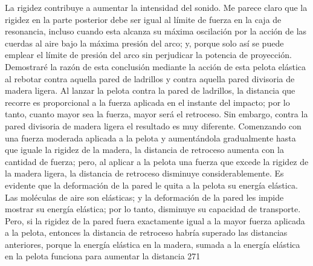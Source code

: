 La rigidez contribuye a aumentar la intensidad del sonido. Me parece claro que la rigidez en la parte posterior debe ser igual al límite de fuerza en la caja de resonancia, incluso cuando esta alcanza su máxima oscilación por la acción de las cuerdas al aire bajo la máxima presión del arco; y, porque solo así se puede emplear el límite de presión del arco sin perjudicar la potencia de proyección.
Demostraré la razón de esta conclusión mediante la acción de esta pelota elástica al rebotar contra aquella pared de ladrillos y contra aquella pared divisoria de madera ligera. Al lanzar la pelota contra la pared de ladrillos, la distancia que recorre es proporcional a la fuerza aplicada en el instante del impacto; por lo tanto, cuanto mayor sea la fuerza, mayor será el retroceso. Sin embargo, contra la pared divisoria de madera ligera el resultado es muy diferente. Comenzando con una fuerza moderada aplicada a la pelota y aumentándola gradualmente hasta que iguale la rigidez de la madera, la distancia de retroceso aumenta con la cantidad de fuerza; pero, al aplicar a la pelota una fuerza que excede la rigidez de la madera ligera, la distancia de retroceso disminuye considerablemente. Es evidente que la deformación de la pared le quita a la pelota su energía elástica. Las moléculas de aire son elásticas; y la deformación de la pared les impide mostrar su energía elástica; por lo tanto, disminuye su capacidad de transporte. Pero, si la rigidez de la pared fuera exactamente igual a la mayor fuerza aplicada a la pelota, entonces la distancia de retroceso habría superado las distancias anteriores, porque la energía elástica en la madera, sumada a la energía elástica
en la pelota funciona para aumentar la distancia
271

